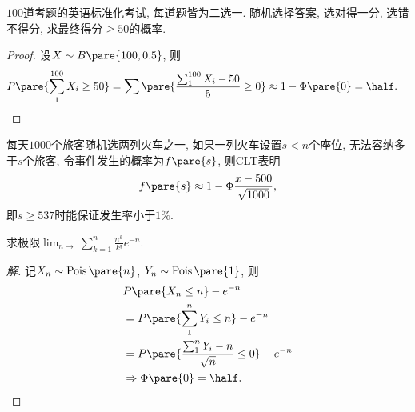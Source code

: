 \documentclass{ctexart}
\DeclareMathOperator{\Pois}{Pois}
\begin{document}
\begin{sample}
    \begin{ex}
        $100$道考题的英语标准化考试, 每道题皆为二选一. 随机选择答案, 选对得一分, 选错不得分, 求最终得分$\ge 50$的概率.
    \end{ex}
    \begin{proof}
        设$X\sim B\pare{100, 0.5}$, 则
        \begin{align*}
            P\pare{\sum_1^{100}X_i \ge 50} &= \sum\pare{\frac{\sum_1^{100}X_i - 50}{5}\ge 0} \approx 1 - \Phi\pare{0} = \half. \qedhere
        \end{align*}
    \end{proof}
\end{sample}
\begin{sample}
    \begin{ex}
        每天$1000$个旅客随机选两列火车之一, 如果一列火车设置$s<n$个座位, 无法容纳多于$s$个旅客, 令事件发生的概率为$f\pare{s}$, 则CLT表明
        \[ f\pare{s} \approx 1-\Phi{\frac{x - 500}{\sqrt{1000}}}, \]
        即$s\ge 537$时能保证发生率小于$1\%$.
    \end{ex}
\end{sample}
\begin{sample}
    \begin{ex}
        求极限$\displaystyle \lim_{n\rightarrow} \sum_{k=1}^n \frac{n^k}{k!}e^{-n}$.
    \end{ex}
    \begin{proof}[解]
        记$X_n \sim \Pois\pare{n}$, $Y_n \sim \Pois\pare{1}$, 则
        \begin{align*}
            & P\pare{X_n \le n} - e^{-n} \\
            &= P\pare{\sum_{1}^n Y_i \le n} - e^{-n} \\
            &= P\pare{\frac{\sum_{1}^n Y_i - n}{\sqrt{n}} \le 0} - e^{-n} \\
            &\Rightarrow \Phi\pare{0} = \half. \qedhere
        \end{align*}
    \end{proof}
\end{sample}


\end{document}
